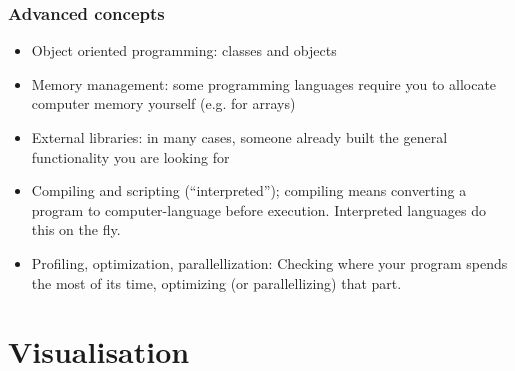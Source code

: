 \documentclass[11pt,table,final,fleqn,xcolor={usenames,dvipsnames},unknownkeysallowed]{beamer}
\begin{document}
% 
\begin{frame}
 \frametitle{Advanced concepts}
 \begin{itemize}
   \item Object oriented programming: classes and objects
   \item Memory management: some programming languages require you to allocate computer memory yourself (e.g. for arrays)
   \item External libraries: in many cases, someone already built the general functionality you are looking for
   \item Compiling and scripting (``interpreted''); compiling means converting a program to computer-language before execution. Interpreted languages do this on the fly.
   \item Profiling, optimization, parallellization: Checking where your program spends the most of its time, optimizing (or parallellizing) that part.
 \end{itemize}
\end{frame}
% 
% 
\section{Visualisation}
\end{document}
